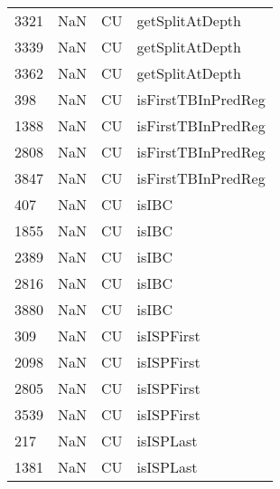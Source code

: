 \begin{tabular}{llll}
3321 &                   NaN &                         CU &                           getSplitAtDepth \\
3339 &                   NaN &                         CU &                           getSplitAtDepth \\
3362 &                   NaN &                         CU &                           getSplitAtDepth \\
398  &                   NaN &                         CU &                        isFirstTBInPredReg \\
1388 &                   NaN &                         CU &                        isFirstTBInPredReg \\
2808 &                   NaN &                         CU &                        isFirstTBInPredReg \\
3847 &                   NaN &                         CU &                        isFirstTBInPredReg \\
407  &                   NaN &                         CU &                                     isIBC \\
1855 &                   NaN &                         CU &                                     isIBC \\
2389 &                   NaN &                         CU &                                     isIBC \\
2816 &                   NaN &                         CU &                                     isIBC \\
3880 &                   NaN &                         CU &                                     isIBC \\
309  &                   NaN &                         CU &                                isISPFirst \\
2098 &                   NaN &                         CU &                                isISPFirst \\
2805 &                   NaN &                         CU &                                isISPFirst \\
3539 &                   NaN &                         CU &                                isISPFirst \\
217  &                   NaN &                         CU &                                 isISPLast \\
1381 &                   NaN &                         CU &                                 isISPLast \\

\end{tabular}
